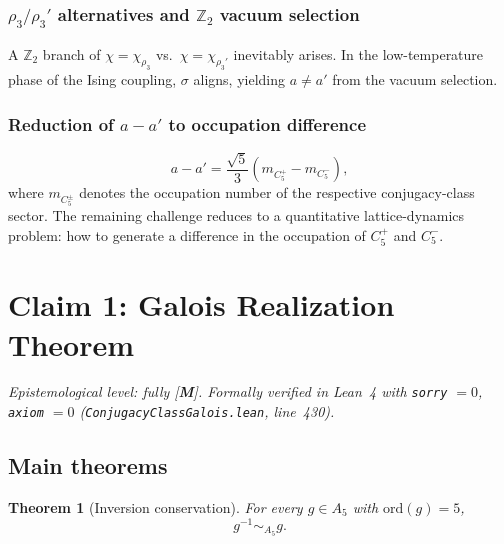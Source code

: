 \documentclass[sn-mathphys-num,Numbered]{sn-jnl}
\theoremstyle{thmstyleone}
\newtheorem{theorem}{Theorem}[section]
\theoremstyle{thmstylethree}
\theoremstyle{thmstyletwo}
\newcommand{\tagM}{[\textbf{M}]}
\begin{document}
\subsubsection{\texorpdfstring{$\rho_3/\rho_3'$}{rho3/rho3'} alternatives
  and \texorpdfstring{$\mathbb{Z}_2$}{Z2} vacuum selection}
\label{sssec:z2-vacuum}

A $\mathbb{Z}_2$ branch of $\chi = \chi_{\rho_3}$ vs.\
$\chi = \chi_{\rho_3'}$ inevitably arises.  In the low-temperature phase
of the Ising coupling, $\sigma$ aligns, yielding $a \neq a'$ from the
vacuum selection.

\subsubsection{Reduction of \texorpdfstring{$a - a'$}{a-a'} to occupation
  difference}
\label{sssec:occupation}

\begin{equation}
  a - a' = \frac{\sqrt{5}}{3}\left(m_{C_5^+} - m_{C_5^-}\right),
  \label{eq:occupation}
\end{equation}
where $m_{C_5^\pm}$ denotes the occupation number of the respective
conjugacy-class sector.  The remaining challenge reduces to a
quantitative lattice-dynamics problem: how to generate a difference in
the occupation of $C_5^+$ and $C_5^-$.

\section{Claim 1: Galois Realization Theorem}
\label{sec:claim1}

\noindent\textit{Epistemological level: fully \tagM.
Formally verified in Lean~4 with \texttt{sorry} $= 0$,
\texttt{axiom} $= 0$ \textup{(}\texttt{ConjugacyClassGalois.lean},
line~430\textup{)}.}

\bigskip

\subsection{Main theorems}
\label{ssec:claim1-main}

\begin{theorem}[Inversion conservation]
\label{thm:inversion}
For every $g \in A_5$ with $\mathrm{ord}(g) = 5$,
\[
  g^{-1} \sim_{A_5} g.
\]
\end{theorem}
\end{document}
